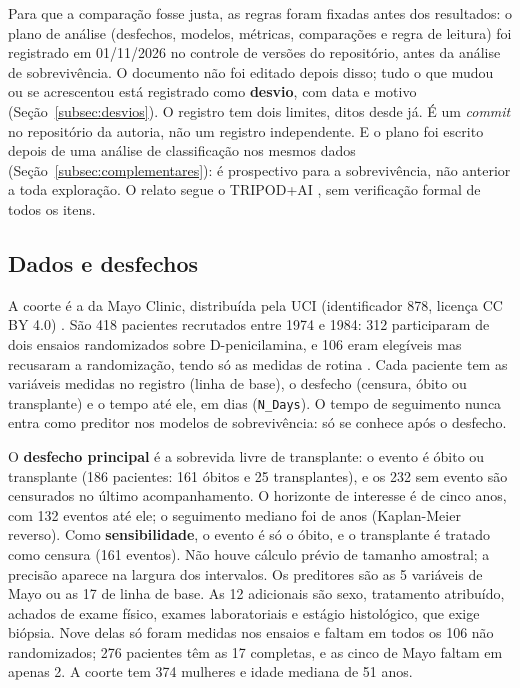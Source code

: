 \documentclass[12pt]{article}
\begin{document}
Para que a comparação fosse justa, as regras foram fixadas antes dos resultados: o plano de análise (desfechos, modelos, métricas, comparações e regra de leitura) foi registrado em 01/11/2026 no controle de versões do repositório, antes da análise de sobrevivência. O documento não foi editado depois disso; tudo o que mudou ou se acrescentou está registrado como \textbf{desvio}, com data e motivo (Seção~\ref{subsec:desvios}). O registro tem dois limites, ditos desde já. É um \textit{commit} no repositório da autoria, não um registro independente. E o plano foi escrito depois de uma análise de classificação nos mesmos dados (Seção~\ref{subsec:complementares}): é prospectivo para a sobrevivência, não anterior a toda exploração. O relato segue o TRIPOD+AI \cite{collins2024tripodai}, sem verificação formal de todos os itens.

\subsection{Dados e desfechos}\label{subsec:dados}

A coorte é a da Mayo Clinic, distribuída pela UCI (identificador 878, licença CC BY 4.0) \cite{uci878}. São 418 pacientes recrutados entre 1974 e 1984: 312 participaram de dois ensaios randomizados sobre D-penicilamina, e 106 eram elegíveis mas recusaram a randomização, tendo só as medidas de rotina \cite{dickson1989prognosis}. Cada paciente tem as variáveis medidas no registro (linha de base), o desfecho (censura, óbito ou transplante) e o tempo até ele, em dias (\texttt{N\_Days}). O tempo de seguimento nunca entra como preditor nos modelos de sobrevivência: só se conhece após o desfecho.

O \textbf{desfecho principal} é a sobrevida livre de transplante: o evento é óbito ou transplante (186 pacientes: 161 óbitos e 25 transplantes), e os 232 sem evento são censurados no último acompanhamento. O horizonte de interesse é de cinco anos, com 132 eventos até ele; o seguimento mediano foi de \seguimentoMediano{} anos (Kaplan-Meier reverso). Como \textbf{sensibilidade}, o evento é só o óbito, e o transplante é tratado como censura (161 eventos). Não houve cálculo prévio de tamanho amostral; a precisão aparece na largura dos intervalos. Os preditores são as 5 variáveis de Mayo ou as 17 de linha de base. As 12 adicionais são sexo, tratamento atribuído, achados de exame físico, exames laboratoriais e estágio histológico, que exige biópsia. Nove delas só foram medidas nos ensaios e faltam em todos os 106 não randomizados; 276 pacientes têm as 17 completas, e as cinco de Mayo faltam em apenas 2. A coorte tem 374 mulheres e idade mediana de 51 anos.
\end{document}
